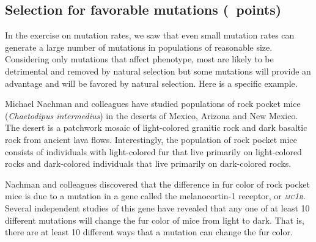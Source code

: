 \documentclass[11pt, hidelinks, addpoints]{exam}
\begin{document}
\subsection*{Selection for favorable mutations (\numpoints\ points)}

In the exercise on mutation rates, we saw that even small mutation rates
can generate a large number of mutations in populations of reasonable
size. Considering only mutations that affect phenotype, most are likely
to be detrimental and removed by natural selection but some mutations
will provide an advantage and will be favored by natural selection.
Here is a specific example.

Michael Nachman and colleagues have studied populations of rock pocket
mice (\textit{Chaetodipus intermedius}) in the deserts of Mexico, Arizona
and New Mexico. The desert is a patchwork mosaic of light-colored
granitic rock and dark basaltic rock from ancient lava flows.
Interestingly, the population of rock pocket mice consists of
individuals with light-colored fur that live primarily on light-colored
rocks and dark-colored individuals that live primarily on dark-colored
rocks.

Nachman and colleagues discovered that the difference in fur color of
rock pocket mice is due to a mutation in a gene called the
melanocortin-1 receptor, or \textit{\textsc{mc1r}}. Several independent studies of
this gene have revealed that any one of at least 10 different mutations
will change the fur color of mice from light to dark. That is, there are
at least 10 different ways that a mutation can change the fur color.
\end{document}
